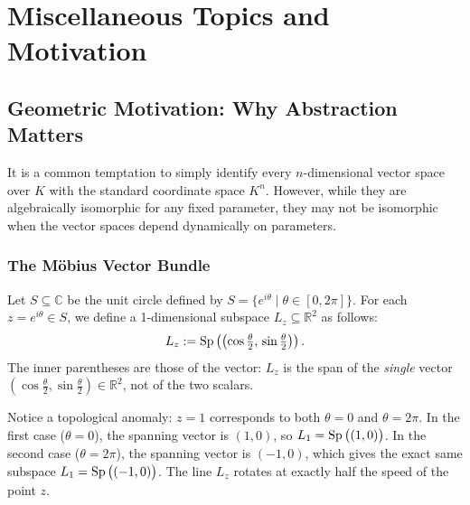 \renewcommand{\thetheorem}{19.\arabic{theorem}}
\setcounter{theorem}{0}
\setcounter{chapter}{18} %

\chapter{Miscellaneous Topics and Motivation}


\section{Geometric Motivation: Why Abstraction Matters}

It is a common temptation to simply identify every $n$-dimensional vector space over $K$ with the standard coordinate space $K^n$. However, while they are algebraically isomorphic for any fixed parameter, they may not be  isomorphic when the vector spaces depend dynamically on parameters.

\subsection{The Möbius Vector Bundle}

\begin{definition}
  \label{def:mobius_family}
  Let $S \subseteq \mathbb{C}$ be the unit circle defined by $S = \{e^{i\theta} \mid \theta \in [0, 2\pi]\}$. For each $z = e^{i\theta} \in S$, we define a 1-dimensional subspace $L_z \subseteq \mathbb{R}^2$ as follows:
  \[ L_z := \operatorname{Sp} \left( \left( \cos\tfrac{\theta}{2}, \, \sin\tfrac{\theta}{2} \right) \right). \]
  The inner parentheses are those of the vector: $L_z$ is the span of the \emph{single} vector $(\cos\frac{\theta}{2}, \sin\frac{\theta}{2}) \in \mathbb{R}^2$, not of the two scalars.
\end{definition}

Notice a topological anomaly: $z=1$ corresponds to both $\theta=0$ and $\theta=2\pi$.
In the first case ($\theta=0$), the spanning vector is $(1,0)$, so $L_1 = \operatorname{Sp}\big((1,0)\big)$.
In the second case ($\theta=2\pi$), the spanning vector is $(-1,0)$, which gives the exact same subspace $L_1 = \operatorname{Sp}\big((-1,0)\big)$. The line $L_z$ rotates at exactly half the speed of the point $z$.

